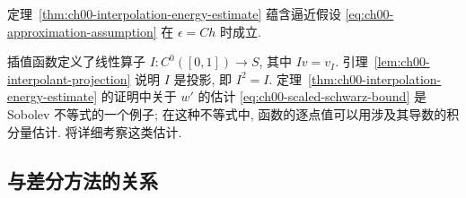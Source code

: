 \begin{Proof}
定理~\ref{thm:ch00-interpolation-energy-estimate} 蕴含逼近假设 \eqref{eq:ch00-approximation-assumption} 在 $\epsilon=Ch$ 时成立.
\end{Proof}

\setcounter{thmcount}{7}
\begin{Remark}
\label{rem:ch00-interpolation-operator}
插值函数定义了线性算子 $I:C^0([0,1])\to S$, 其中 $Iv=v_I$. 引理~\ref{lem:ch00-interpolant-projection} 说明 $I$ 是投影, 即 $I^2=I$. 定理~\ref{thm:ch00-interpolation-energy-estimate} 的证明中关于 $w'$ 的估计 \eqref{eq:ch00-scaled-schwarz-bound} 是 Sobolev 不等式的一个例子; 在这种不等式中, 函数的逐点值可以用涉及其导数的积分量估计.  将详细考察这类估计.
\end{Remark}
\subsection{与差分方法的关系}
\label{sec:ch00-relation-to-difference-methods}

